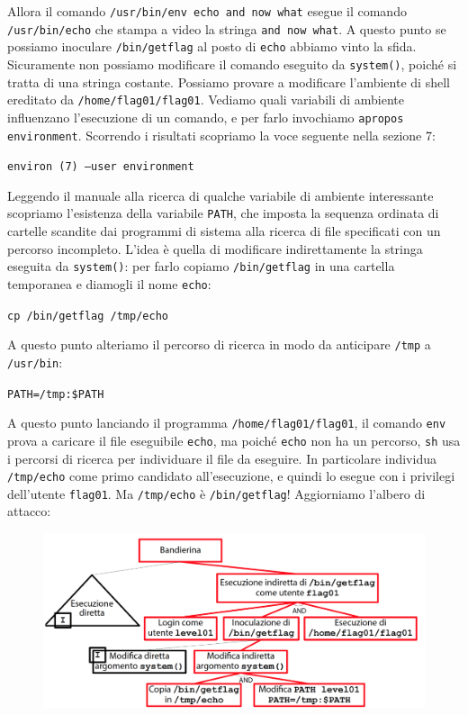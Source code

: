 \vspace{5mm}

Allora il comando \texttt{/usr/bin/env echo and now what} esegue il comando \texttt{/usr/bin/echo} che stampa a video la stringa \texttt{and now what}. A questo punto se possiamo inoculare \texttt{/bin/getflag} al posto di \texttt{echo} abbiamo vinto la sfida. Sicuramente non possiamo modificare il comando eseguito da \texttt{system()}, poiché si tratta di una stringa costante. Possiamo provare a modificare l'ambiente di shell ereditato da \texttt{/home/flag01/flag01}. Vediamo quali variabili di ambiente influenzano l'esecuzione di un comando, e per farlo invochiamo \texttt{apropos environment}. Scorrendo i risultati scopriamo la voce seguente nella sezione 7:
\begin{center}
    \texttt{environ (7) –user environment}
\end{center}
Leggendo il manuale alla ricerca di qualche variabile di ambiente interessante scopriamo l'esistenza della variabile \texttt{PATH}, che imposta la sequenza ordinata di cartelle scandite dai programmi di sistema alla ricerca di file specificati con un percorso incompleto. L'idea è quella di modificare indirettamente la stringa eseguita da \texttt{system()}: per farlo copiamo \texttt{/bin/getflag} in una cartella temporanea e diamogli il nome \texttt{echo}:
\begin{center}
    \texttt{cp /bin/getflag /tmp/echo}
\end{center}
A questo punto alteriamo il percorso di ricerca in modo da anticipare \texttt{/tmp} a \texttt{/usr/bin}:
\begin{center}
    \texttt{PATH=/tmp:\$PATH}
\end{center}
A questo punto lanciando il programma \texttt{/home/flag01/flag01}, il comando \texttt{env} prova a caricare il file eseguibile \texttt{echo}, ma poiché \texttt{echo} non ha un percorso, \texttt{sh} usa i percorsi di ricerca per individuare il file da eseguire. In particolare individua \texttt{/tmp/echo} come primo candidato all'esecuzione, e quindi lo esegue con i privilegi dell'utente \texttt{flag01}. Ma \texttt{/tmp/echo} è \texttt{/bin/getflag}! Aggiorniamo l'albero di attacco:

\begin{figure}[hbpt!]
    \centering
    \includegraphics[width=0.8 \textwidth]{./Images/cap5/5.5.png}
\end{figure}
\FloatBarrier


